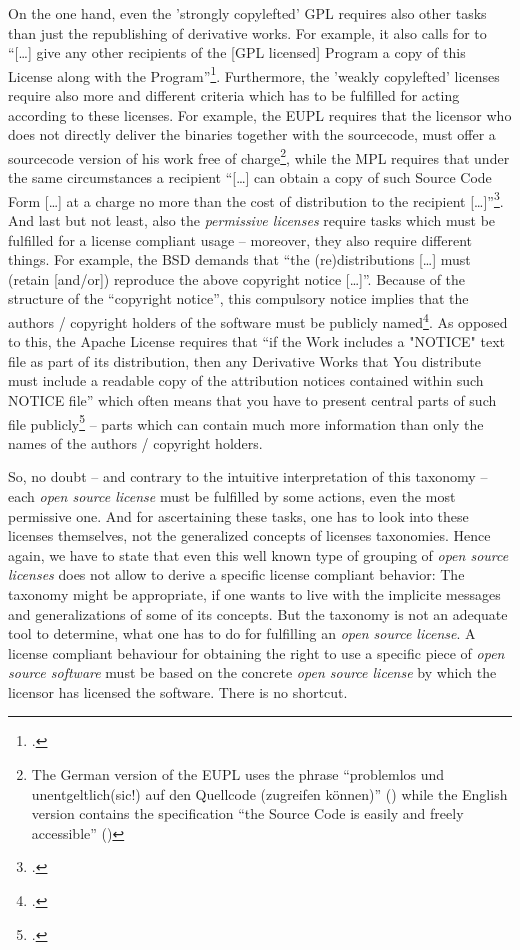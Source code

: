 On the one hand, even the 'strongly copylefted' GPL requires also other tasks
than just the republishing of derivative works. For example, it also calls for
to \enquote{[\ldots] give any other recipients of the [GPL licensed] Program a
copy of this License along with the Program}\footcite[cf.][\nopage wp\
§1]{Gpl20OsiLicense1991a}. Furthermore, the 'weakly copylefted' licenses require
also more and different criteria which has to be fulfilled for acting according
to these licenses. For example, the EUPL requires that the licensor who does not
directly deliver the binaries together with the sourcecode, must offer a
sourcecode version of his work free of charge\footnote{The German version of the
EUPL uses the phrase \enquote{problemlos und unentgeltlich(sic!) auf den
Quellcode (zugreifen können)} (\cite[cf.][3, section 3]{EuplLicense2007de})
while the English version contains the specification \enquote{the Source Code is
easily and freely accessible} (\cite[cf.][2, section 3]{EuplLicense2007en})},
while the MPL requires that under the same circumstances a recipient
\enquote{[\ldots] can obtain a copy of such Source Code Form [\ldots] at a
charge no more than the cost of distribution to the recipient
[\ldots]}\footcite[cf.][\nopage section 3.2.a]{Mpl20OsiLicense2013a}.
And last but not least, also the \emph{permissive licenses} require tasks which
must be fulfilled for a license compliant usage -- moreover, they also require
different things. For example, the BSD demands that \enquote{the
(re)distributions [\ldots] must (retain [and/or]) reproduce the above copyright
notice [\ldots]}. Because of the structure of the \enquote{copyright notice},
this compulsory notice implies that the authors / copyright holders of the
software must be publicly named\footcite[cf.][\nopage wp]{BsdLicense2Clause}. As
opposed to this, the Apache License requires that \enquote{if the Work includes
a "NOTICE" text file as part of its distribution, then any Derivative Works that
You distribute must include a readable copy of the attribution notices contained
within such NOTICE file} which often means that you have to present central
parts of such file publicly\footcite[cf.][\nopage wp\ section
4.4]{Apl20OsiLicense2004a} -- parts which can contain much more information than
only the names of the authors / copyright holders.

So, no doubt -- and contrary to the intuitive interpretation of this taxonomy --
each \emph{open source license} must be fulfilled by some actions, even the most
permissive one. And for ascertaining these tasks, one has to look into these
licenses themselves, not the generalized concepts of licenses taxonomies. Hence
again, we have to state that even this well known type of grouping of \emph{open
source licenses} does not allow to derive a specific license compliant behavior:
The taxonomy might be appropriate, if one wants to live with the implicite
messages and generalizations of some of its concepts. But the taxonomy is not an
adequate tool to determine, what one has to do for fulfilling an \emph{open
source license}. A license compliant behaviour for obtaining the right to use a
specific piece of \emph{open source software} must be based on the concrete
\emph{open source license} by which the licensor has licensed the software.
There is no shortcut.

